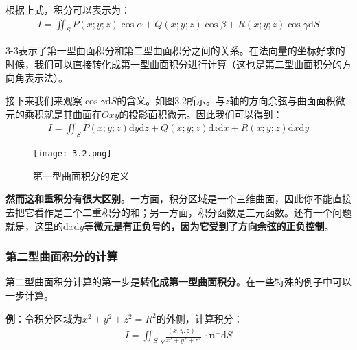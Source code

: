 \documentclass{ctexart}
\let\oldtextbf\textbf
\renewcommand{\textbf}[1]{\textcolor{brown!50!red}{\oldtextbf{#1}}}
\begin{document}
\begin{tcolorbox}[
    colback=bac2,     %
    colframe=fra2,   %
    coltitle=white,             %
    coltext=tex2,
    title=第二型曲面积分的表示,
    fonttitle=\bfseries,        %
arc=3mm,                     %
breakable
]
根据上式，积分可以表示为：
\begin{align*}
I=\iint_SP(x;y;z)\cos\alpha+Q(x;y;z)\cos\beta+R(x;y;z)\cos\gamma\mathrm{d}S \tag{3-3} 
\end{align*}

3-3表示了第一型曲面积分和第二型曲面积分之间的关系。在法向量的坐标好求的时候，我们可以直接转化成第一型曲面积分进行计算（这也是第二型曲面积分的方向角表示法）。

接下来我们来观察$\cos\gamma\mathrm{d}S$的含义。如图3.2所示。与$z$轴的方向余弦与曲面面积微元的乘积就是其曲面在$Oxy$的投影面积微元。因此我们可以得到：
\begin{align*}
I=\iint_{S}P(x;y;z)\mathrm
{d}y\mathrm{d}z+Q(x;y;z)\mathrm
{d}z\mathrm{d}x+R(x;y;z)\mathrm
{d}x\mathrm{d}y \tag{3-4} 
\end{align*}

\begin{figure}[H]    
\centering     
\renewcommand{\figurename}{图}     
\renewcommand{\thefigure}{3.2}    
\begin{myimagebox}[width=0.35\textwidth] %
\texttt{[image: 3.2.png]} %
\end{myimagebox}     
\caption{\label{fig:3.2}第一型曲面积分的定义}   
\end{figure}

\end{tcolorbox}


\textbf{\color{brown!50!red}然而这和重积分有很大区别}。一方面，积分区域是一个三维曲面，因此你不能直接去把它看作是三个二重积分的和；另一方面，积分函数是三元函数。还有一个问题就是，这里的$\mathrm{d}x\mathrm{d}y$等\textbf{\color{brown!50!red}微元是有正负号的，因为它受到了方向余弦的正负控制}。

\subsubsection{第二型曲面积分的计算}
第二型曲面积分计算的第一步是\textbf{\color{brown!50!red}转化成第一型曲面积分}。在一些特殊的例子中可以一步计算。

\textbf{\color{brown!50!red}例}：令积分区域为$x^2+y^2+z^2=R^2$的外侧，计算积分：
\begin{align*}
I=\iint_S\frac{(x,y,z)}{\sqrt{x^2+y^2+z^2}}\cdot \bm{n}^+  \mathrm{d}S 
\end{align*}
\end{document}

